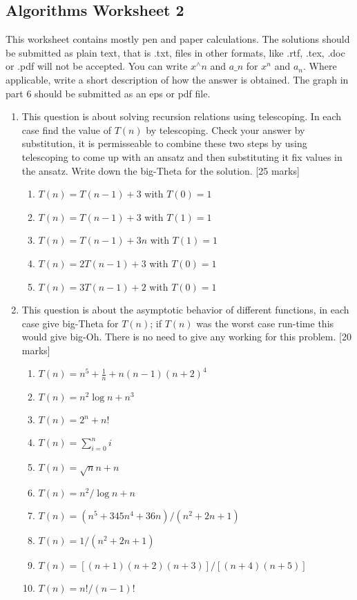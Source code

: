 \documentclass[11pt,a4paper]{scrartcl}
\begin{document}
\subsection*{Algorithms Worksheet 2}

This worksheet contains mostly pen and paper calculations. The
solutions should be submitted as plain text, that is .txt, files in
other formats, like .rtf, .tex, .doc or .pdf will not be accepted. You
can write $x^\wedge n$ and $a\_n$ for $x^n$ and $a_n$. Where
applicable, write a short description of how the answer is
obtained. The graph in part 6 should be submitted as an eps or pdf
file.

\begin{enumerate}

\item This question is about solving recursion relations using
  telescoping. In each case find the value of $T(n)$ by
  telescoping. Check your answer by substitution, it is permisseable
  to combine these two steps by using telescoping to come up with an
  ansatz and then substituting it fix values in the ansatz. Write down
  the big-Theta for the solution. [25 marks] 

\begin{enumerate}
\item $T(n)=T(n-1)+3$ with $T(0)=1$
\item $T(n)=T(n-1)+3$ with $T(1)=1$
\item $T(n)=T(n-1)+3n$ with $T(1)=1$
\item $T(n)=2T(n-1)+3$ with $T(0)=1$
\item $T(n)=3T(n-1)+2$ with $T(0)=1$
\end{enumerate}

\item This question is about the asymptotic behavior of
  different functions, in each case give big-Theta for $T(n)$; if
  $T(n)$ was the worst case run-time this would give big-Oh. There is
  no need to give any working for this problem.  [20 marks]

\begin{enumerate}

\item $T(n)=n^5+\frac{1}{n}+n(n-1)(n+2)^4$
\item $T(n)=n^2\log{n}+n^3$
\item $T(n)=2^n+n!$
\item $T(n)=\sum_{i=0}^ni$
\item $T(n)=\sqrt{n}n+n$
\item $T(n)=n^2/\log{n}+n$
\item $T(n)=(n^5+345n^4+36n)/(n^2+2n+1)$
\item $T(n)=1/(n^2+2n+1)$
\item $T(n)=[(n+1)(n+2)(n+3)]/[(n+4)(n+5)]$
\item $T(n)=n!/(n-1)!$


\end{enumerate}
\end{enumerate}
\end{document}
